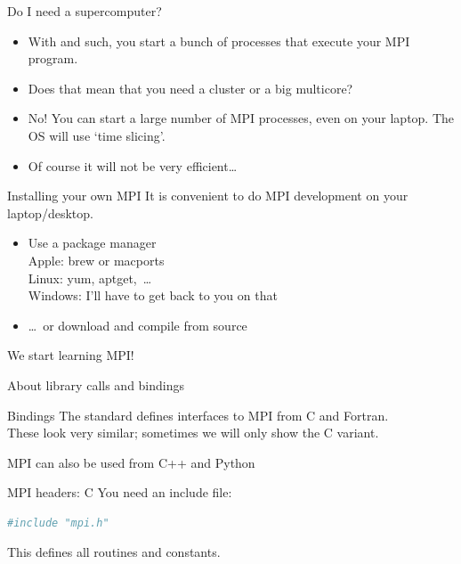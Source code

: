 \begin{numberedframe}{Do I need a supercomputer?}
  \begin{itemize}
  \item With  and such, you start a bunch of processes that
    execute your MPI program.
  \item Does that mean that you need a cluster or a big multicore?
  \item No! You can start a large number of MPI processes, even on
    your laptop. The OS will use `time slicing'.
  \item Of course it will not be very efficient\ldots
  \end{itemize}
\end{numberedframe}

\begin{numberedframe}{Installing your own MPI}
  It is convenient to do MPI development on your laptop/desktop.
  \begin{itemize}
  \item Use a package manager\\
    Apple: brew or macports\\
    Linux: yum, aptget,~\ldots\\
    Windows: I'll have to get back to you on that
  \item \ldots~or download and compile from source 
  \end{itemize}
\end{numberedframe}

 {We start learning MPI!}

 {About library calls and bindings}

\begin{numberedframe}{Bindings}
  The standard defines interfaces to MPI
  from C and Fortran.\\
  These look very similar;
  sometimes we will only show the C variant.

  MPI can also be used from C++ and Python
\end{numberedframe}

\begin{numberedframe}{MPI headers: C}
\label{sl:mpi-header-c}
You need an include file:
\begin{lstlisting}[language=bash]
#include "mpi.h"
\end{lstlisting}
This defines all routines and constants.
\end{numberedframe}

